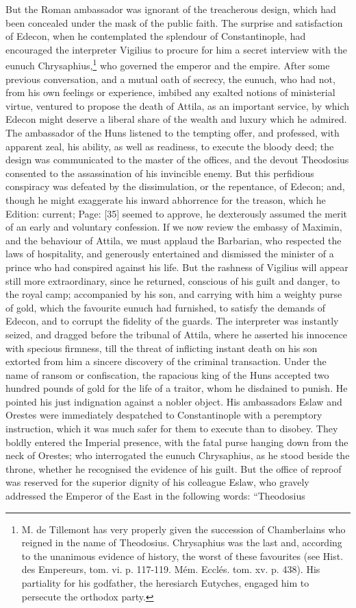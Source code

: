 But the Roman ambassador was ignorant of the treacherous design, which had been concealed under the mask of the public faith. The surprise and satisfaction of Edecon, when he contemplated the splendour of Constantinople, had encouraged the interpreter Vigilius to procure for him a secret interview with the eunuch Chrysaphius,\footnote{M. de Tillemont has very properly given the succession of Chamberlains who reigned in the name of Theodosius. Chrysaphius was the last and, according to the unanimous evidence of history, the worst of these favourites (see Hist. des Empereurs, tom. vi. p. 117-119. Mém. Ecclés. tom. xv. p. 438). His partiality for his godfather, the heresiarch Eutyches, engaged him to persecute the orthodox party.} who governed the emperor and the empire. After some previous conversation, and a mutual oath of secrecy, the eunuch, who had not, from his own feelings or experience, imbibed any exalted notions of ministerial virtue, ventured to propose the death of Attila, as an important service, by which Edecon might deserve a liberal share of the wealth and luxury which he admired. The ambassador of the Huns listened to the tempting offer, and professed, with apparent zeal, his ability, as well as readiness, to execute the bloody deed; the design was communicated to the master of the offices, and the devout Theodosius consented to the assassination of his invincible enemy. But this perfidious conspiracy was defeated by the dissimulation, or the repentance, of Edecon; and, though he might exaggerate his inward abhorrence for the treason, which he Edition: current; Page: [35] seemed to approve, he dexterously assumed the merit of an early and voluntary confession. If we now review the embassy of Maximin, and the behaviour of Attila, we must applaud the Barbarian, who respected the laws of hospitality, and generously entertained and dismissed the minister of a prince who had conspired against his life. But the rashness of Vigilius will appear still more extraordinary, since he returned, conscious of his guilt and danger, to the royal camp; accompanied by his son, and carrying with him a weighty purse of gold, which the favourite eunuch had furnished, to satisfy the demands of Edecon, and to corrupt the fidelity of the guards. The interpreter was instantly seized, and dragged before the tribunal of Attila, where he asserted his innocence with specious firmness, till the threat of inflicting instant death on his son extorted from him a sincere discovery of the criminal transaction. Under the name of ransom or confiscation, the rapacious king of the Huns accepted two hundred pounds of gold for the life of a traitor, whom he disdained to punish. He pointed his just indignation against a nobler object. His ambassadors Eslaw and Orestes were immediately despatched to Constantinople with a peremptory instruction, which it was much safer for them to execute than to disobey. They boldly entered the Imperial presence, with the fatal purse hanging down from the neck of Orestes; who interrogated the eunuch Chrysaphius, as he stood beside the throne, whether he recognised the evidence of his guilt. But the office of reproof was reserved for the superior dignity of his colleague Eslaw, who gravely addressed the Emperor of the East in the following words: \texthebrew{“}Theodosius 